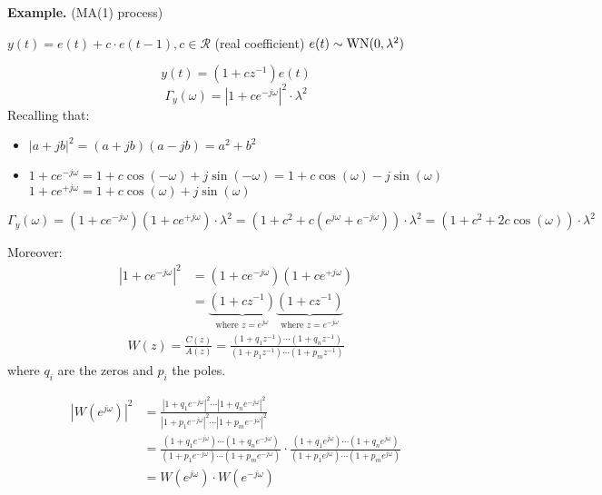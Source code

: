 \textbf{Example.} (MA(1) process)

$y(t)=e(t)+c \cdot e(t-1), c \in \mathcal{R}$ (real coefficient)
$e(t)\sim \operatorname{WN}(0,\lambda^{2} )$

$$
y(t)=\left(1+c z^{-1}\right) e(t)
$$
$$
\Gamma_{y}(\omega)=\left|1+c e^{-j \omega}\right|^{2} \cdot \lambda^{2}
$$
Recalling that:
\begin{itemize}
	\item $|a+j b|^{2}=(a+j b)(a-j b)=a^{2}+b^{2}$
	\item $1+c e^{-j \omega}=1+c \cos (-\omega)+j \sin (-\omega)=1+c \cos (\omega)-j \sin (\omega)$ $1+c e^{+j \omega}=1+c \cos (\omega)+j \sin (\omega)$
\end{itemize}

$$
\Gamma_{y}(\omega)=\left(1+c e^{-j \omega}\right)\left(1+c e^{+j \omega}\right)\cdot \lambda^{2}=(1+c^{2}+c\left(e^{j \omega}+e^{-j \omega}\right))\cdot \lambda^{2}=(1+c^{2}+2 c \cos (\omega))\cdot \lambda^{2}
$$


Moreover:
\begin{align*}
	|1+c e^{-j \omega}|^2&=\left(1+c e^{-j \omega}\right)\left(1+c e^{+j \omega}\right)\\
	&=\underbrace{\left(1+c z^{-1}\right)}_\text{where $z=e^{j \omega}$}\underbrace{\left(1+c z^{-1}\right)}_\text{where $z=e^{-j \omega}$}
\end{align*}
\begin{align*}
	W(z)=\frac{C(z)}{A(z)}=\frac{(1+q_1z^{-1})\cdots(1+q_nz^{-1})}{(1+p_1z^{-1})\cdots(1+p_mz^{-1})}
\end{align*}
where $q_i$ are the zeros and $p_i$ the poles.

\begin{align*}
	\left|W\left(e^{j \omega}\right)\right|^{2}&=\frac{|1+q_1e^{-j \omega}|^2\cdots|1+q_ne^{-j \omega}|^2}{|1+p_1e^{-j \omega}|^2\cdots|1+p_me^{-j \omega}|^2}\\
	&=\frac{(1+q_1e^{-j \omega})\cdots(1+q_ne^{-j \omega})}{(1+p_1e^{-j \omega})\cdots(1+p_me^{-j \omega})}\cdot\frac{(1+q_1e^{j \omega})\cdots(1+q_ne^{j \omega})}{(1+p_1e^{j \omega})\cdots(1+p_me^{j \omega})}\\
			&=W\left(e^{j \omega}\right)\cdot W\left(e^{-j \omega}\right)
\end{align*}